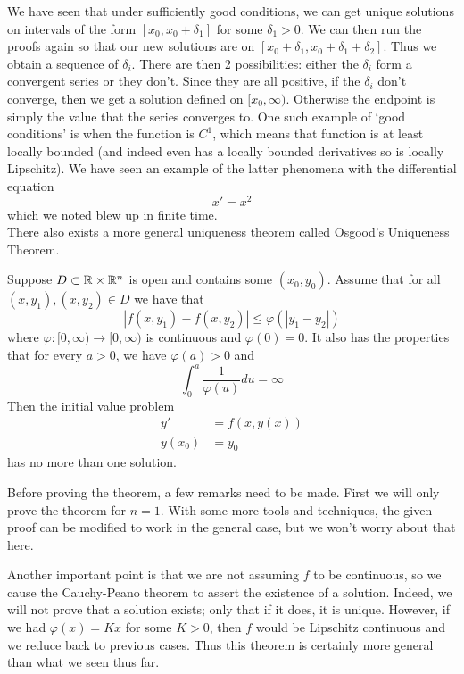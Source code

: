 We have seen that under sufficiently good conditions, we can get unique solutions on intervals of the form $[x_0, x_0 + \delta_1]$ for some $\delta_1 > 0$. We can then run the proofs again so that our new solutions are on $[x_0 + \delta_1, x_0 + \delta_1 + \delta_2]$. Thus we obtain a sequence of $\delta_i$. There are then 2 possibilities: either the $\delta_i$ form a convergent series or they don't. Since they are all positive, if the $\delta_i$ don't converge, then we get a solution defined on $[x_0, \infty)$. Otherwise the endpoint is simply the value that the series converges to. One such example of `good conditions' is when the function is $C^1$, which means that function is at least locally bounded (and indeed even has a locally bounded derivatives so is locally Lipschitz). We have seen an example of the latter phenomena with the differential equation
$$ x' = x^2 $$
which we noted blew up in finite time.
\\

There also exists a more general uniqueness theorem called Osgood's Uniqueness Theorem.
\begin{theorem}
    Suppose $D \subset \mathbb{R} \times \mathbb{R}^n$ is open and contains some $(x_0, y_0)$. Assume that for all $(x, y_1), (x, y_2) \in D$ we have that 
    $$ |f(x, y_1) - f(x, y_2)| \leq \varphi(|y_1 - y_2|) $$
    where $\varphi: [0, \infty) \to [0, \infty)$ is continuous and $\varphi(0) = 0$. It also has the properties that for every $a > 0$, we have $\varphi(a) > 0$ and
    $$ \int_{0}^{a} \frac{1}{\varphi(u)} du = \infty $$
    Then the initial value problem
    \begin{align*}
        y' &= f(x, y(x))\\
        y(x_0) &= y_0
    \end{align*}
    has no more than one solution.
\end{theorem}
Before proving the theorem, a few remarks need to be made. First we will only prove the theorem for $n = 1$. With some more tools and techniques, the given proof can be modified to work in the general case, but we won't worry about that here.

Another important point is that we are not assuming $f$ to be continuous, so we cause the Cauchy-Peano theorem to assert the existence of a solution. Indeed, we will not prove that a solution exists; only that if it does, it is unique. However, if we had $\varphi(x) = Kx$ for some $K > 0$, then $f$ would be Lipschitz continuous and we reduce back to previous cases. Thus this theorem is certainly more general than what we seen thus far.

